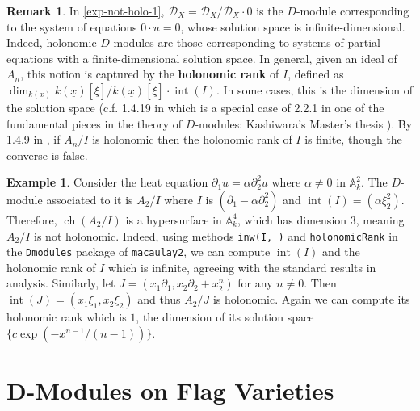 \documentclass[11pt, a4paper]{article}
\theoremstyle{definition}
\newtheorem{remark}[theorem]{Remark}
\newtheorem{example}[theorem]{Example}
\newcommand{\A}[0]{\mathbb{A}}
\newcommand{\ch}{\operatorname{ch}}
\begin{document}
    \begin{remark}
        In \cref{exp-not-holo-1}, $\mathcal D_X=\mathcal D_X/\mathcal D_X\cdot 0$ is the $D$-module corresponding to the system of equations $0\cdot u=0$, whose solution space is infinite-dimensional. Indeed, holonomic $D$-modules are those corresponding to systems of partial equations with a finite-dimensional solution space. In general, given an ideal of $A_n$, this notion is captured by the \textbf{holonomic rank} of $I$, defined as $\dim_{k(\underline{x})}k(\underline{x})[\underline{\xi}]/k(\underline{x})[\underline{\xi}]\cdot\operatorname{int}(I)$. In some cases, this is the dimension of the solution space (c.f. 1.4.19 in \cite{sst-computational} which is a special case of 2.2.1 in one of the fundamental pieces in the theory of $D$-modules: Kashiwara's Master's thesis \cite{kashiwara-master}). By 1.4.9 in \cite{sst-computational}, if $A_n/I$ is holonomic then the holonomic rank of $I$ is finite, though the converse is false.
    \end{remark}
    \begin{example}
        Consider the heat equation $\partial_1u=\alpha\partial_2^2u$ where $\alpha\neq 0$ in $\A^2_k$. The $D$-module associated to it is $A_2/I$ where $I$ is $(\partial_1-\alpha\partial_2^2)$ and $\operatorname{int}(I)=(\alpha\xi_2^2)$. Therefore, $\ch(A_2/I)$ is a hypersurface in $\A^4_k$, which has dimension $3$, meaning $A_2/I$ is not holonomic. Indeed, using methods \mbox{\texttt{inw(I, )}} and \mbox{\texttt{holonomicRank}} in the \mbox{\texttt{Dmodules}} package of \mbox{\texttt{macaulay2}}, we can compute $\operatorname{int}(I)$ and the holonomic rank of $I$ which is infinite, agreeing with the standard results in analysis. Similarly, let $J=(x_1\partial_1, x_2\partial_2+x_2^n)$ for any $n\neq 0$. Then $\operatorname{int}(J)=(x_1\xi_1, x_2\xi_2)$ and thus $A_2/J$ is holonomic. Again we can compute its holonomic rank which is $1$, the dimension of its solution space $\{c\exp(-x^{n-1}/(n-1))\}$.
    \end{example}


    \section{D-Modules on Flag Varieties}
\end{document}

